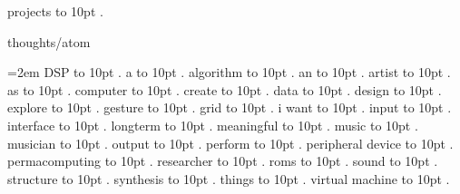 \smallskip
projects \leaders\hbox to 10pt {\hss.\hss}  \hfill {}
\smallskip
\par\endgroup
\bigskip
{}
thoughts/atom
\par\begingroup
\leftskip=2em
\smallskip
\medskip
DSP \leaders\hbox to 10pt {\hss.\hss}  \hfill {}
\smallskip
a \leaders\hbox to 10pt {\hss.\hss}  \hfill {}
\smallskip
algorithm \leaders\hbox to 10pt {\hss.\hss}  \hfill {}
\smallskip
an \leaders\hbox to 10pt {\hss.\hss}  \hfill {}
\smallskip
artist \leaders\hbox to 10pt {\hss.\hss}  \hfill {}
\smallskip
as \leaders\hbox to 10pt {\hss.\hss}  \hfill {}
\smallskip
computer \leaders\hbox to 10pt {\hss.\hss}  \hfill {}
\smallskip
create \leaders\hbox to 10pt {\hss.\hss}  \hfill {}
\smallskip
data \leaders\hbox to 10pt {\hss.\hss}  \hfill {}
\smallskip
design \leaders\hbox to 10pt {\hss.\hss}  \hfill {}
\smallskip
explore \leaders\hbox to 10pt {\hss.\hss}  \hfill {}
\smallskip
gesture \leaders\hbox to 10pt {\hss.\hss}  \hfill {}
\smallskip
grid \leaders\hbox to 10pt {\hss.\hss}  \hfill {}
\smallskip
i want \leaders\hbox to 10pt {\hss.\hss}  \hfill {}
\smallskip
input \leaders\hbox to 10pt {\hss.\hss}  \hfill {}
\smallskip
interface \leaders\hbox to 10pt {\hss.\hss}  \hfill {}
\smallskip
longterm \leaders\hbox to 10pt {\hss.\hss}  \hfill {}
\smallskip
meaningful \leaders\hbox to 10pt {\hss.\hss}  \hfill {}
\smallskip
music \leaders\hbox to 10pt {\hss.\hss}  \hfill {}
\smallskip
musician \leaders\hbox to 10pt {\hss.\hss}  \hfill {}
\smallskip
output \leaders\hbox to 10pt {\hss.\hss}  \hfill {}
\smallskip
perform \leaders\hbox to 10pt {\hss.\hss}  \hfill {}
\smallskip
peripheral device \leaders\hbox to 10pt {\hss.\hss}  \hfill {}
\smallskip
permacomputing \leaders\hbox to 10pt {\hss.\hss}  \hfill {}
\smallskip
researcher \leaders\hbox to 10pt {\hss.\hss}  \hfill {}
\smallskip
roms \leaders\hbox to 10pt {\hss.\hss}  \hfill {}
\smallskip
sound \leaders\hbox to 10pt {\hss.\hss}  \hfill {}
\smallskip
structure \leaders\hbox to 10pt {\hss.\hss}  \hfill {}
\smallskip
synthesis \leaders\hbox to 10pt {\hss.\hss}  \hfill {}
\smallskip
things \leaders\hbox to 10pt {\hss.\hss}  \hfill {}
\smallskip
virtual machine \leaders\hbox to 10pt {\hss.\hss}  \hfill {}
\smallskip
\par\endgroup
\bigskip
{}
